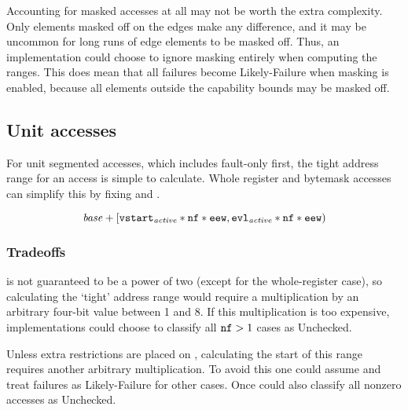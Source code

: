 Accounting for masked accesses at all may not be worth the extra complexity.
Only elements masked off on the edges make any difference, and it may be uncommon for long runs of edge elements to be masked off.
Thus, an implementation could choose to ignore masking entirely when computing the ranges.
This does mean that all failures become Likely-Failure when masking is enabled, because all elements outside the capability bounds may be masked off.


\subsection{Unit accesses}
For unit segmented accesses, which includes fault-only first, the tight address range for an access is simple to calculate.
Whole register and bytemask accesses can simplify this by fixing  and .

\begin{equation}
    \mathit{base}{} + [{\texttt{vstart}}_{\mathit{active}}{} * {\texttt{nf}} * {\texttt{eew}}, {\texttt{evl}}_{\mathit{active}}{} * {\texttt{nf}} * {\texttt{eew}})
\end{equation}

\subsubsection*{Tradeoffs}
 is not guaranteed to be a power of two (except for the whole-register case), so calculating the `tight' address range would require a multiplication by an arbitrary four-bit value between 1 and 8.
If this multiplication is too expensive, implementations could choose to classify all ${\texttt{nf}} > 1$ cases as Unchecked.

Unless extra restrictions are placed on , calculating the start of this range requires another arbitrary multiplication.
To avoid this one could assume  and treat failures as Likely-Failure for other cases.
Once could also classify all nonzero  accesses as Unchecked.

